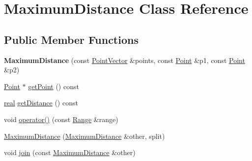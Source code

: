 \hypertarget{class_maximum_distance}{
\section{MaximumDistance Class Reference}
\label{class_maximum_distance}
}
\subsection*{Public Member Functions}
\begin{CompactItemize}
\item 
\hypertarget{class_maximum_distance_53a46dbac3acecf2223f4966cd73cd69}{
\textbf{MaximumDistance} (const \hyperlink{class_point}{PointVector} \&points, const \hyperlink{class_point}{Point} \&p1, const \hyperlink{class_point}{Point} \&p2)}
\label{class_maximum_distance_53a46dbac3acecf2223f4966cd73cd69}

\item 
\hyperlink{class_point}{Point} $\ast$ \hyperlink{class_maximum_distance_8e1dae43c6ec3865ea79dd7caf27ad8f}{getPoint} () const 
\item 
\hyperlink{cowichan_8hpp_4d521b2c54a1f6312cc8fa04827eaf98}{real} \hyperlink{class_maximum_distance_1a187dd3950b791434bb5223d6b16882}{getDistance} () const 
\item 
void \hyperlink{class_maximum_distance_69c66442a93a92b18266ba55909f6c15}{operator()} (const \hyperlink{cowichan__tbb_8hpp_8e2057f725b08f3a15513c378a453a47}{Range} \&range)
\item 
\hyperlink{class_maximum_distance_1cfb6fc5edbc0495b2fe27304063b68e}{MaximumDistance} (\hyperlink{class_maximum_distance}{MaximumDistance} \&other, split)
\item 
void \hyperlink{class_maximum_distance_8e224531b8c5e9a9f9e506f3e674586b}{join} (const \hyperlink{class_maximum_distance}{MaximumDistance} \&other)
\end{CompactItemize}
